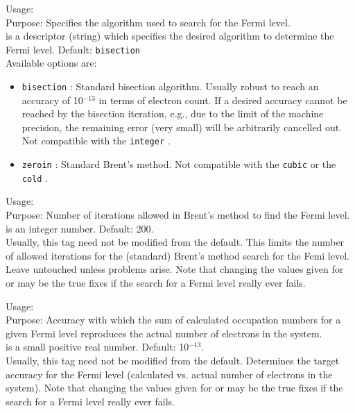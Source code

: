 {
  \noindent
  Usage:   \\[1.0ex]
  Purpose: Specifies the algorithm used to search for the Fermi level. \\[1.0ex]
   is a descriptor (string) which specifies the desired algorithm
    to determine the Fermi level.  Default: \texttt{bisection} \\
}
Available options are:
\begin{itemize}
  \item \texttt{bisection} : Standard bisection algorithm. Usually robust to
    reach an accuracy of 10$^{-13}$ in terms of electron count. If a desired
    accuracy cannot be reached by the bisection iteration, e.g., due to the
    limit of the machine precision, the remaining error (very small) will be
    arbitrarily cancelled out. Not compatible with the \texttt{integer}
    .
  \item \texttt{zeroin} : Standard Brent's method. Not compatible with the
    \texttt{cubic} or the \texttt{cold} .
\end{itemize}

{
  \noindent
  Usage:   \\[1.0ex]
  Purpose: Number of iterations allowed in Brent's method to find the Fermi
    level. \\[1.0ex]
   is an integer number. Default: 200. \\
}
Usually, this tag need not be modified from the default. This limits the number
of allowed iterations for the (standard) Brent's method search for the Femi
level. Leave untouched unless problems arise. Note that changing the values
given for  or  may be the true
fixes if the search for a Fermi level really ever fails.

{
  \noindent
  Usage:   \\[1.0ex]
  Purpose: Accuracy with which the sum of calculated occupation numbers for a
    given Fermi level reproduces the actual number of electrons in the system.
    \\[1.0ex]
   is a small positive real number. Default: 10$^{-13}$. \\
}
Usually, this tag need not be modified from the default. Determines the target
accuracy for the Fermi level (calculated vs. actual number of electrons in the
system). Note that changing the values given for  or
 may be the true fixes if the search for a Fermi level
really ever fails.

